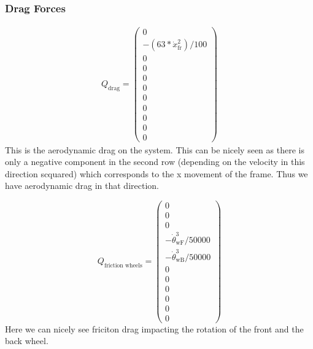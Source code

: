 \subsubsection{Drag Forces}
\begin{equation}
    \begin{split}
        Q_\text{drag} =
        \begin{pmatrix}
            0\\
-(63*\dot x_\text{fr}^2)/100\\
                0\\
                0\\
                0\\
                0\\
                0\\
                0\\
                0\\
                0\\
                0
        \end{pmatrix}
    \end{split}
\end{equation}
This is the aerodynamic drag on the system. This can be nicely seen as there is only a negative component in the second row (depending on the velocity in this direction scquared) which corresponds to the x movement of the frame. Thus we have aerodynamic drag in that direction.

\begin{equation}Q_\text{friction wheels} = 
    \begin{pmatrix}
        0\\
        0\\
        0\\
-\dot\theta_\text{wF}^3/50000\\
-\dot\theta_\text{wB}^3/50000\\
        0\\
        0\\
        0\\
        0\\
        0\\
        0
    \end{pmatrix}
\end{equation}
Here we can nicely see friciton drag impacting the rotation of the front and the back wheel.

